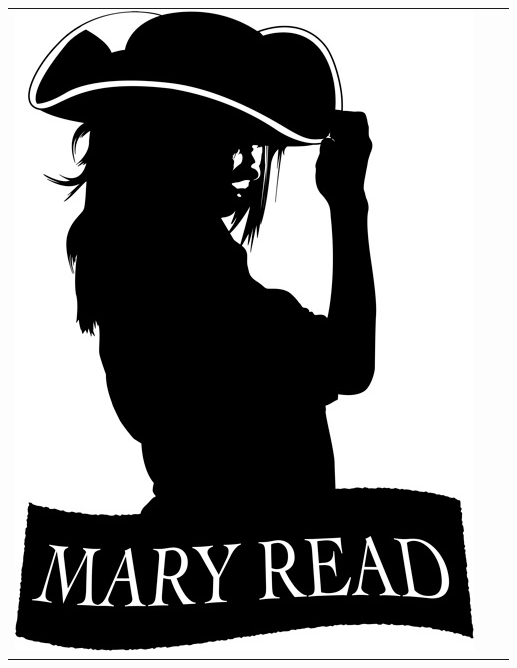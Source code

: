 \begin{tabular}{c c c}
\includegraphics[height=\gamlaAffischerHeight]{Bilder/TidigareSpexloggor/Mary_logga.jpeg}\\


\end{tabular}
